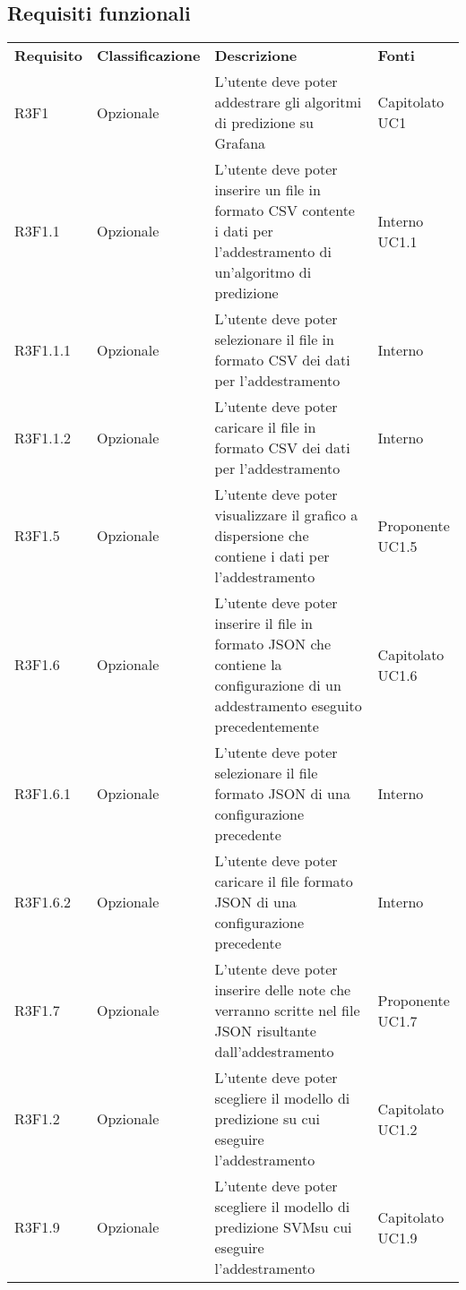 \subsection{Requisiti funzionali}
	\setcounter{table}{0}
	\begin{longtable} {
		>{}p{24mm} 
		>{}p{32mm}
		>{}p{40mm} 
		>{}p{24.5mm}
		}
	\rowcolor{gray!50}
		\textbf{Requisito} & \textbf{Classificazione} & \textbf{Descrizione} & \textbf{Fonti} 	\TBstrut \\
		R3F1 & Opzionale & L'utente deve poter addestrare gli algoritmi di predizione su Grafana\glo & Capitolato UC1 \TBstrut \\ [2mm]
		R3F1.1 & Opzionale & L'utente deve poter inserire un file in formato CSV contente i dati per l'addestramento di un'algoritmo di predizione & Interno UC1.1 \TBstrut \\ [2mm]
		R3F1.1.1 & Opzionale & L'utente deve poter selezionare il file in formato CSV dei dati per l'addestramento & Interno \TBstrut \\ [2mm]
		R3F1.1.2 & Opzionale & L'utente deve poter caricare il file in formato CSV dei dati per l'addestramento & Interno \TBstrut \\ [2mm]
		R3F1.5 & Opzionale & L'utente deve poter visualizzare il grafico a dispersione che contiene i dati per l'addestramento & Proponente UC1.5 \TBstrut \\ [2mm]
		R3F1.6 & Opzionale & L'utente deve poter inserire il file in formato JSON che contiene la configurazione di un addestramento eseguito precedentemente & Capitolato UC1.6 \TBstrut \\ [2mm]
		R3F1.6.1 & Opzionale & L'utente deve poter selezionare il file formato JSON di una configurazione precedente & Interno \TBstrut \\ [2mm]
		R3F1.6.2 & Opzionale & L'utente deve poter caricare il file formato JSON di una configurazione precedente & Interno \TBstrut \\ [2mm]
		R3F1.7 & Opzionale & L'utente deve poter inserire delle note che verranno scritte nel file JSON risultante dall'addestramento & Proponente UC1.7 \TBstrut \\ [2mm]
		R3F1.2 & Opzionale & L'utente deve poter scegliere il modello di predizione su cui eseguire l'addestramento & Capitolato UC1.2 \TBstrut \\ [2mm]
		R3F1.9 & Opzionale & L'utente deve poter scegliere il modello di predizione SVM\glosp su cui eseguire l'addestramento & Capitolato UC1.9 \TBstrut \\ [2mm]

\end{longtable}
